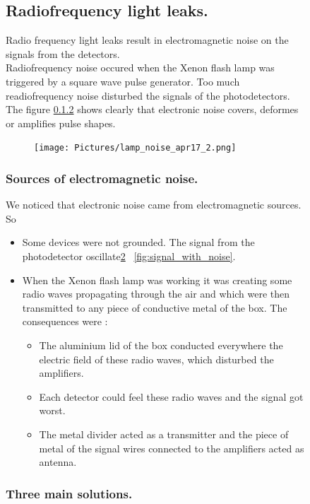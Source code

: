 \documentclass[a4paper, 11pt]{report}%
\newcommand{\xfl}{Xenon flash lamp }
\begin{document}
\begin{figure}[!hbtp]
  \subsection{Radiofrequency light leaks.}
  
  Radio frequency light leaks result in electromagnetic noise on the signals from the detectors.\\  
  Radiofrequency noise occured when the \xfl was triggered by a square wave pulse generator. Too much readiofrequency noise disturbed 
  the signals of the photodetectors. The figure \ref{} shows clearly that electronic noise covers, deformes or amplifies pulse shapes.
  
  \begin{figure}[!hbtp]
  \centering
    \texttt{[image: Pictures/lamp\_noise\_apr17\_2.png]}
  \label{fig:noise_signal}
  \end{figure}
  
  \subsubsection{Sources of electromagnetic noise.}
  
  We noticed that electronic noise came from electromagnetic sources. So

  \begin{itemize}
  \item Some devices were not grounded. The signal from the photodetector oscillate\ref{fig:noise_signal}
  ~\ref{fig:signal_with_noise}.
  \item When the \xfl was working it was creating some radio waves propagating through the air and which were then transmitted to any piece of conductive metal of the 
  box. The consequences were : 
    \begin{itemize}
    \item The aluminium lid of the box conducted everywhere the electric field of these radio waves, which disturbed the amplifiers.
    \item Each detector could feel these radio waves and the signal got worst.
    \item The metal divider acted as a transmitter and the piece of metal of the signal wires connected to the amplifiers acted as antenna.
    \end{itemize}
  \end{itemize}
  
  \subsubsection{Three main solutions.}
  

\end{figure}
\end{document}
